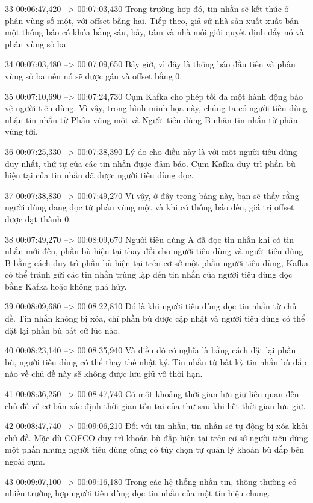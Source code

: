 33
00:06:47,420 --> 00:07:03,430
Trong trường hợp đó, tin nhắn sẽ kết thúc ở phân vùng số một, với offset bằng hai.  Tiếp theo, giả sử nhà sản xuất xuất bản một thông báo có khóa bằng sáu, bảy, tám và nhà môi giới quyết định đẩy nó và phân vùng số ba.

34
00:07:03,480 --> 00:07:09,650
Bây giờ, vì đây là thông báo đầu tiên và phân vùng số ba nên nó sẽ được gán và offset bằng 0.

35
00:07:10,690 --> 00:07:24,730
Cụm Kafka cho phép tối đa một hành động bảo vệ người tiêu dùng.  Vì vậy, trong hình minh họa này, chúng ta có người tiêu dùng nhận tin nhắn từ Phân vùng một và Người tiêu dùng B nhận tin nhắn từ phân vùng tới.

36
00:07:25,330 --> 00:07:38,390
Lý do cho điều này là với một người tiêu dùng duy nhất, thứ tự của các tin nhắn được đảm bảo.  Cụm Kafka duy trì phần bù hiện tại của tin nhắn đã được người tiêu dùng đọc.

37
00:07:38,830 --> 00:07:49,270
Vì vậy, ở đây trong bảng này, bạn sẽ thấy rằng người dùng đang đọc từ phân vùng một và khi có thông báo đến, giá trị offset được đặt thành 0.

38
00:07:49,270 --> 00:08:09,670
Người tiêu dùng A đã đọc tin nhắn khi có tin nhắn mới đến, phần bù hiện tại thay đổi cho người tiêu dùng và người tiêu dùng B bằng cách duy trì phần bù hiện tại trên cơ sở một phần người tiêu dùng, Kafka có thể tránh gửi các tin nhắn trùng lặp đến tin nhắn của người tiêu dùng đọc bằng Kafka hoặc không phá hủy.

39
00:08:09,680 --> 00:08:22,810
Đó là khi người tiêu dùng đọc tin nhắn từ chủ đề.  Tin nhắn không bị xóa, chỉ phần bù được cập nhật và người tiêu dùng có thể đặt lại phần bù bất cứ lúc nào.

40
00:08:23,140 --> 00:08:35,940
Và điều đó có nghĩa là bằng cách đặt lại phần bù, người tiêu dùng có thể thay thế nhật ký.  Tin nhắn từ bất kỳ tin nhắn bù đắp nào về chủ đề này sẽ không được lưu giữ vô thời hạn.

41
00:08:36,250 --> 00:08:47,740
Có một khoảng thời gian lưu giữ liên quan đến chủ đề về cơ bản xác định thời gian tồn tại của thư sau khi hết thời gian lưu giữ.

42
00:08:47,740 --> 00:09:06,210
Đối với tin nhắn, tin nhắn sẽ tự động bị xóa khỏi chủ đề.  Mặc dù COFCO duy trì khoản bù đắp hiện tại trên cơ sở người tiêu dùng một phần nhưng người tiêu dùng cũng có tùy chọn tự quản lý khoản bù đắp bên ngoài cụm.

43
00:09:07,100 --> 00:09:16,180
Trong các hệ thống nhắn tin, thông thường có nhiều trường hợp người tiêu dùng đọc tin nhắn của một tín hiệu chung.

